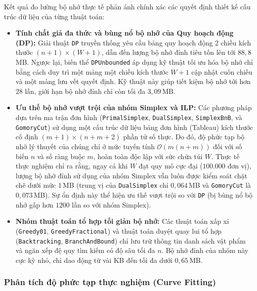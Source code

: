\documentclass[fontsize=13pt,a4paper]{report}
\begin{document}
Kết quả đo lường bộ nhớ thực tế phản ánh chính xác các quyết định thiết kế cấu trúc dữ liệu của từng thuật toán:
\begin{itemize}[leftmargin=*]
    \item \textbf{Tính chất giả đa thức và bùng nổ bộ nhớ của Quy hoạch động (DP):} Giải thuật \texttt{DP} truyền thống yêu cầu bảng quy hoạch động 2 chiều kích thước $(n+1) \times (W+1)$, dẫn đến lượng bộ nhớ đỉnh tiêu tốn lên tới $88,8$\,MB. Ngược lại, biến thể \texttt{DPUnbounded} áp dụng kỹ thuật tối ưu hóa bộ nhớ chỉ bằng cách duy trì một mảng một chiều kích thước $W+1$ cập nhật cuốn chiếu và một mảng lưu vết quyết định. Kỹ thuật này giúp tiết kiệm bộ nhớ tới hơn $28$ lần, giới hạn bộ nhớ đỉnh chỉ còn tối đa $3,09$\,MB.
    \item \textbf{Ưu thế bộ nhớ vượt trội của nhóm Simplex và ILP:} Các phương pháp dựa trên ma trận đơn hình (\texttt{PrimalSimplex}, \texttt{DualSimplex}, \texttt{SimplexBnB}, và \texttt{GomoryCut}) sử dụng một cấu trúc dữ liệu bảng đơn hình (Tableau) kích thước cố định $(m+1) \times (n+m+2)$ phần tử số thực. Do đó, độ phức tạp bộ nhớ lý thuyết của chúng chỉ ở mức tuyến tính $\mathcal{O}(m(n+m))$ đối với số biến $n$ và số ràng buộc $m$, hoàn toàn độc lập với sức chứa túi $W$. Thực tế thực nghiệm chỉ ra rằng, ngay cả khi $W$ đạt quy mô cực đại ($100.000$ đơn vị), lượng bộ nhớ đỉnh sử dụng của nhóm Simplex vẫn luôn được kiểm soát chặt chẽ dưới mức $1$\,MB (trung vị của \texttt{DualSimplex} chỉ $0,064$\,MB và \texttt{GomoryCut} là $0,073$\,MB). Sự ổn định này thể hiện ưu thế vượt trội so với \texttt{DP} (bị bùng nổ bộ nhớ gấp hơn $1200$ lần so với nhóm Simplex).
    \item \textbf{Nhóm thuật toán tổ hợp tối giản bộ nhớ:} Các thuật toán xấp xỉ (\texttt{Greedy01}, \texttt{GreedyFractional}) và thuật toán duyệt quay lui tổ hợp (\texttt{Backtracking}, \texttt{BranchAndBound}) chỉ lưu trữ thông tin danh sách vật phẩm và ngăn xếp đệ quy tìm kiếm có độ sâu tối đa $n$. Bộ nhớ đỉnh của nhóm này cực kỳ nhỏ, chỉ dao động từ vài KB đến tối đa dưới $0,65$\,MB.
\end{itemize}

\FloatBarrier
\subsubsection{Phân tích độ phức tạp thực nghiệm (Curve Fitting)}
\label{subsubsec:curve_fitting}
\end{document}
